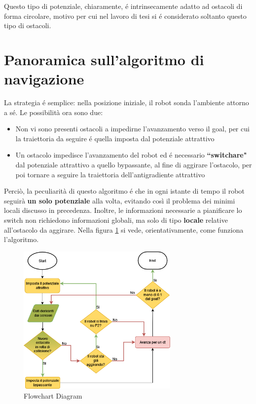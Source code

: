 \documentclass[14pt,a4paper]{extarticle}
\begin{document}
Questo tipo di potenziale, chiaramente, é intrinsecamente adatto ad ostacoli di forma circolare, motivo per cui nel lavoro di tesi si é considerato soltanto questo tipo di ostacoli.

\newpage
\section{Panoramica sull'algoritmo di navigazione} 
La strategia é semplice: nella posizione iniziale, il robot sonda l'ambiente attorno a sé. Le possibilità ora sono due:
\begin{itemize}
\item Non vi sono presenti ostacoli a impedirne l'avanzamento verso il goal, per cui la traiettoria da seguire é quella imposta dal potenziale attrattivo
\item Un ostacolo impedisce l'avanzamento del robot ed é necessario \textbf{``switchare"} dal potenziale attrattivo a quello bypassante, al fine di aggirare l'ostacolo, per poi tornare a seguire la traiettoria dell'antigradiente attrattivo
\end{itemize}
Perciò, la peculiarità di questo algoritmo é che in ogni istante di tempo il robot seguirà \textbf{un solo potenziale} alla volta, evitando così il problema dei minimi locali discusso in precedenza. Inoltre, le informazioni necessarie a pianificare lo switch non richiedono informazioni globali, ma solo di tipo \textbf{locale} relative all'ostacolo da aggirare. Nella figura \ref{flow} si vede, orientativamente, come funziona l'algoritmo. 

\begin{figure}[H]
\caption{Flowchart Diagram} \label{flow}
\centering
\includegraphics[width=0.7\textwidth]{flowchart.png}
\end{figure}
\end{document}
